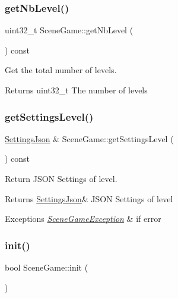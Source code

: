 \subsubsection{\texorpdfstring{get\+Nb\+Level()}{getNbLevel()}}
{\footnotesize\ttfamily uint32\+\_\+t Scene\+Game\+::get\+Nb\+Level (\begin{DoxyParamCaption}{ }\end{DoxyParamCaption}) const}



Get the total number of levels. 

\begin{DoxyReturn}{Returns}
uint32\+\_\+t The number of levels 
\end{DoxyReturn}
\mbox{\label{class_scene_game_aafa85a3148ac0886a2e6dfe1ee5a3d99}} 
\subsubsection{\texorpdfstring{get\+Settings\+Level()}{getSettingsLevel()}}
{\footnotesize\ttfamily \hyperlink{class_settings_json}{Settings\+Json} \& Scene\+Game\+::get\+Settings\+Level (\begin{DoxyParamCaption}{ }\end{DoxyParamCaption}) const}



Return J\+S\+ON Settings of level. 

\begin{DoxyReturn}{Returns}
\hyperlink{class_settings_json}{Settings\+Json}\& J\+S\+ON Settings of level 
\end{DoxyReturn}

\begin{DoxyExceptions}{Exceptions}
{\em \hyperlink{class_scene_game_1_1_scene_game_exception}{Scene\+Game\+Exception}} & if error \\
\hline
\end{DoxyExceptions}
\mbox{\label{class_scene_game_a841268ba3ea129f7c02cfafcafd32a4f}} 
\subsubsection{\texorpdfstring{init()}{init()}}
{\footnotesize\ttfamily bool Scene\+Game\+::init (\begin{DoxyParamCaption}{ }\end{DoxyParamCaption})\hspace{0.3cm}{\ttfamily [virtual]}}

